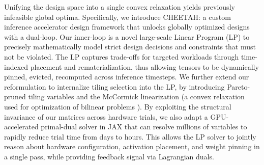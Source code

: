 Unifying the design space into a single convex relaxation yields previously infeasible global optima. Specifically, we introduce CHEETAH: a custom inference accelerator design framework that unlocks globally optimized designs with a dual-loop. Our inner-loop is a novel large-scale Linear Program (LP) to precisely mathematically model strict design decisions and constraints that must not be violated. The LP captures trade-offs for targeted workloads through time-indexed placement and rematerialization, thus allowing tensors to be dynamically pinned, evicted, recomputed across inference timesteps. We further extend our reformulation to internalize tiling selection into the LP, by introducing Pareto-pruned tiling variables and the McCormick linearization (a convex relaxation used for optimization of bilinear problems \citep{mccormick1976computability}). By exploiting the structural invariance of our matrices across hardware trials, we also adapt a GPU-accelerated primal-dual solver in JAX \citep{jax2018github} that can resolve millions of variables to rapidly reduce trial time from days to hours. This allows the LP solver to jointly reason about hardware configuration, activation placement, and weight pinning in a single pass, while providing feedback signal via Lagrangian duals.

